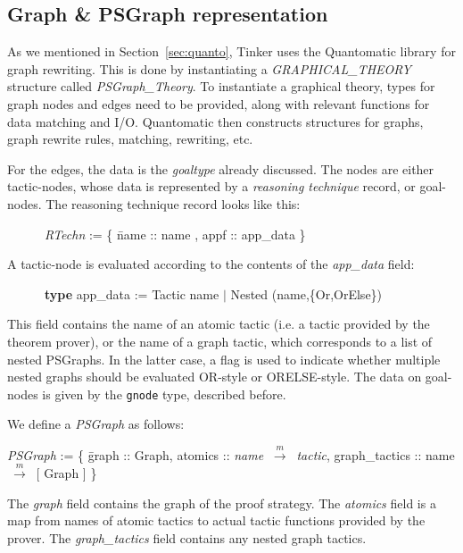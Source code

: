 \documentclass[submission,copyright,creativecommons]{eptcs}
\begin{document}
\subsection{Graph \& PSGraph representation}

As we mentioned in Section~\ref{sec:quanto}, Tinker uses the Quantomatic library for graph rewriting. This is done by instantiating a \textit{GRAPHICAL\_THEORY} structure called \textit{PSGraph\_Theory}. To instantiate a graphical theory, types for graph nodes and edges need to be provided, along with relevant functions for data matching and I/O. Quantomatic then constructs structures for graphs, graph rewrite rules, matching, rewriting, etc.

For the edges, the data is the \emph{goaltype} already discussed. The nodes are either tactic-nodes, whose data is represented by a \textit{reasoning technique} record, or goal-nodes. The reasoning technique record looks like this:
{\it \begin{tabbing}
$\qquad\quad$\textit{RTechn} := \{ \= name :: name , appf :: app\_data \} \\
\end{tabbing}}
\vspace{-15pt}
\noindent A tactic-node is evaluated according to the contents of the \emph{app\_data} field:
{\it \begin{tabbing}
$\qquad\quad$\textbf{type} app\_data := Tactic name $|$ Nested (name,\{Or,OrElse\}) \\
\end{tabbing}}
\vspace{-15pt}
\noindent 
This field contains the name of an atomic tactic (i.e. a tactic provided by the theorem prover), or the name of a graph tactic, which corresponds to a list of nested PSGraphs. In the latter case, a flag is used to indicate whether multiple nested graphs should be evaluated OR-style or ORELSE-style.
The data on goal-nodes is given by the \texttt{gnode} type, described before.


We define a \emph{PSGraph} as follows:
\newcommand{\fmap}{\mbox{$~\stackrel{m}{\rightarrow}~$}}
{\it
\begin{tabbing}
\quad\textit{PSGraph} := \{ \= graph :: Graph, 
 atomics :: \textit{name} \fmap{} \textit{tactic},
 graph\_tactics :: name \fmap{} [ Graph ] \} \\
\end{tabbing}}
\vspace{-15pt}
\noindent 
The \emph{graph} field contains the graph of the proof strategy. The \emph{atomics} field is a map from names of atomic tactics to actual tactic functions provided by the prover. The \emph{graph\_tactics} field contains any nested graph tactics.
\end{document}
